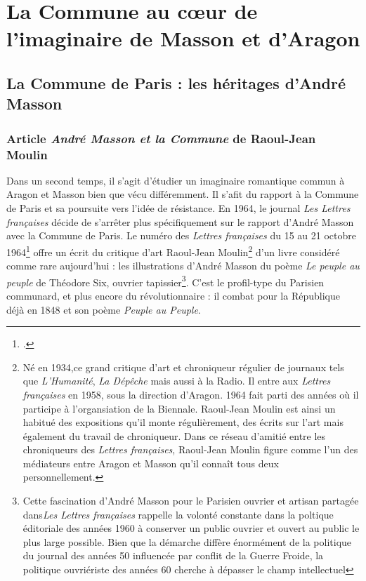 \chapter{La Commune au c\oe{}ur de l'imaginaire de Masson et d'Aragon}

\section{La Commune de Paris : les héritages d'André Masson }

\subsection{Article \emph{André Masson et la Commune} de Raoul-Jean Moulin }

Dans un second temps, il s’agit d'étudier un imaginaire romantique  commun à Aragon et Masson bien que vécu différemment. Il s'afit du rapport à la Commune de Paris et sa poursuite vers l’idée de résistance. En 1964, le journal \emph{Les Lettres françaises} décide de s’arrêter plus spécifiquement sur le rapport d’André Masson avec la Commune de Paris. Le numéro des \emph{Lettres françaises} du 15 au 21 octobre 1964\footcite{commune} offre un écrit du critique d’art Raoul-Jean Moulin\footnote{Né en 1934,ce grand critique d'art et chroniqueur régulier de journaux tels que \emph{L'Humanité}, \emph{La Dépêche} mais aussi à la Radio. Il entre aux \emph{Lettres françaises} en 1958, sous la direction d'Aragon. 1964 fait parti des années où il participe à l'organsiation de la Biennale. Raoul-Jean Moulin est ainsi un habitué des expositions qu'il monte régulièrement, des écrits sur l'art mais également du travail de chroniqueur. Dans ce réseau d'amitié entre les chroniqueurs des \emph{Lettres françaises}, Raoul-Jean Moulin figure comme l'un des médiateurs entre Aragon et Masson qu'il connaît tous deux personnellement.} d’un livre considéré comme rare aujourd’hui : les illustrations d’André Masson du poème \emph{Le peuple au peuple} de Théodore Six, ouvrier tapissier\footnote{Cette fascination d'André Masson pour le Parisien ouvrier et artisan partagée dans\emph{Les Lettres françaises} rappelle la volonté constante dans la poltique éditoriale des années 1960 à conserver un public ouvrier et ouvert au public le plus large possible. Bien que la démarche diffère énormément de la politique du journal des années 50 influencée par conflit de la Guerre Froide, la politique ouvriériste des années 60 cherche à dépasser le champ intellectuel}. C'est le profil-type du Parisien communard, et plus encore du révolutionnaire : il combat pour la République déjà en 1848 et son poème \emph{Peuple au Peuple}. 


